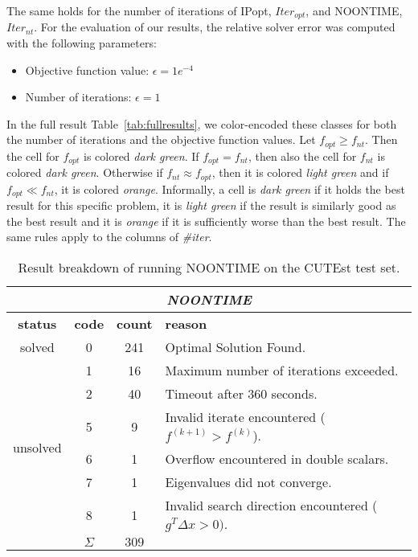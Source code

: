 The same holds for the number of iterations of IPopt, $Iter_{opt}$, and NOONTIME, $Iter_{nt}$. For the evaluation of our results, the relative solver error was computed with the following parameters:
\begin{itemize}
	\item Objective function value: $\epsilon = 1e^{-4}$
	\item Number of iterations: $\epsilon = 1$
\end{itemize}
In the full result Table~\ref{tab:fullresults}, we color-encoded these classes for both the number of iterations and the objective function values.
Let $f_{opt} \geq f_{nt}$. Then the cell for $f_{opt}$ is colored \textit{dark green}. If $f_{opt} = f_{nt}$, then also the cell for $f_{nt}$ is colored \textit{dark green}. Otherwise if $f_{nt} \approx f_{opt}$, then it is colored \textit{light green} and if $f_{opt} \ll f_{nt}$, it is colored \textit{orange}.
Informally, a cell is \textit{dark green} if it holds the best result for this specific problem, it is \textit{light green} if the result is similarly good as the best result and it is \textit{orange} if it is sufficiently worse than the best result.
The same rules apply to the columns of \textit{\#iter}.

\begin{table}[H]
	\begin{tabular}{cccl}
		\multicolumn{4}{c}{\textit{NOONTIME}} \\
		\toprule
		\toprule
		\textbf{status} & \textbf{code} & \textbf{count} & \textbf{reason} \\
		\midrule
		solved & 0 & 241 & Optimal Solution Found. \\
		\midrule
		\multirow{6}{*}{unsolved}
		& 1 & 16 & Maximum number of iterations exceeded. \\
		& 2 & 40 & Timeout after 360 seconds. \\
		& 5 & 9 & Invalid iterate encountered ($f^{(k+1)} > f^{(k)}$). \\
		& 6 & 1 & Overflow encountered in double scalars. \\
		& 7 & 1 & Eigenvalues did not converge. \\
		& 8 & 1 & Invalid search direction encountered ($g^T \Delta x > 0)$. \\
		\bottomrule
		& $\Sigma$ & $309$ &  \\
		\bottomrule
	\end{tabular}
	\caption{Result breakdown of running NOONTIME on the CUTEst test set.}
	\label{tab:stat:noontime}
\end{table}

